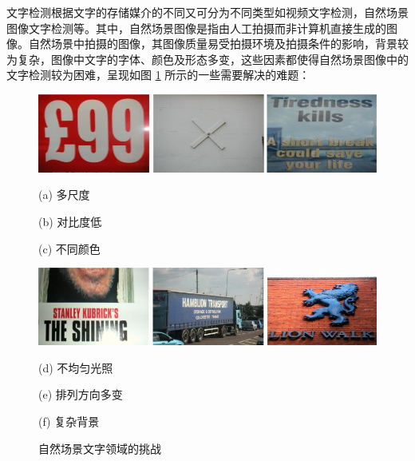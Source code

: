     文字检测根据文字的存储媒介的不同又可分为不同类型如视频文字检测，自然场景图像文字检测等。其中，自然场景图像是指由人工拍摄而非计算机直接生成的图像。自然场景中拍摄的图像，其图像质量易受拍摄环境及拍摄条件的影响，背景较为复杂，图像中文字的字体、颜色及形态多变，这些因素都使得自然场景图像中的文字检测较为困难，呈现如图 \ref{fig.c1_problem} 所示的一些需要解决的难题：

    \begin{figure}[!h]
    \centering
    \includegraphics[width=\textwidth]{./figures/c1_problem_1.jpg}
    \begin{minipage}[t]{0.31\linewidth}
    \centerline{ \small (a) 多尺度}
    \end{minipage}
    \begin{minipage}[t]{0.31\linewidth}
    \centerline{ \small (b) 对比度低}
    \end{minipage}
    \begin{minipage}[t]{0.31\linewidth}
    \centerline{ \small (c) 不同颜色}
    \end{minipage}
    \includegraphics[width=\textwidth]{./figures/c1_problem_2.jpg}
    \begin{minipage}[t]{0.31\linewidth}
    \centerline{ \small (d) 不均匀光照}
    \end{minipage}
    \begin{minipage}[t]{0.31\linewidth}
    \centerline{ \small (e) 排列方向多变}
    \end{minipage}
    \begin{minipage}[t]{0.31\linewidth}
    \centerline{ \small (f) 复杂背景}
    \end{minipage}
    \caption{自然场景文字领域的挑战}
    \label{fig.c1_problem}
    \end{figure}

